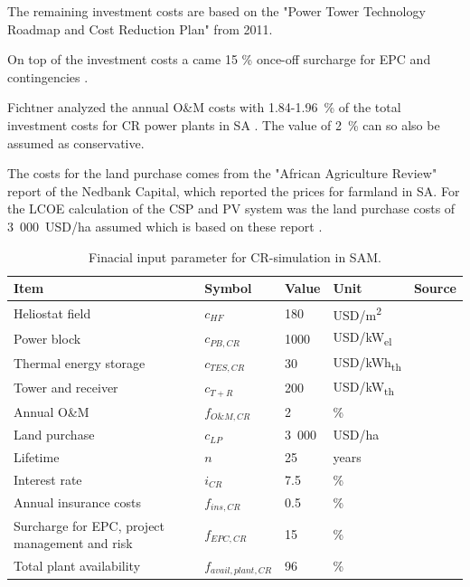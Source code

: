 The remaining investment costs are based on the "Power Tower Technology Roadmap and Cost Reduction Plan" \cite{Kolb2011} from 2011.

On top of the investment costs a came 15 \% once-off surcharge for EPC and contingencies \cite{Platzer2014}.

Fichtner analyzed the annual O\&M costs with 1.84-1.96~\% of the total investment costs for CR power plants in SA \cite{Fichtner2010}. The value of 2~\% can so also be assumed as conservative.

The costs for the land purchase comes from the "African Agriculture Review" report of the Nedbank Capital, which reported the prices for farmland in SA. For the LCOE calculation of the CSP and PV system was the land purchase costs of 3~000~USD/ha assumed which is based on these report \cite{Cassell2012}.

\begin{table}[!h]  
  \centering
	\begin{tabular}{  p{5.0cm} C{2.0cm} C{1.5cm}  C{1.5cm}  C{4.0cm} } 
	\hline	
\textbf{Item} & \textbf{Symbol}& \textbf{Value} & \textbf{Unit} & \textbf{Source}\\ \hline \hline
Heliostat field &$c_{HF}$ & 180 & USD/m\textsuperscript{2} & \cite{Blackmon2012}\\ 
Power block & $c_{PB,CR}$ & 1000 & USD/kW\textsubscript{el} & \cite{Kolb2011}\\ 
Thermal energy storage&$c_{TES,CR}$ & 30 & USD/kWh\textsubscript{th}  & \cite{Kolb2011}\\ 
Tower and receiver& $c_{T+R}$& 200 & USD/kW\textsubscript{th}  & \cite{Kolb2011}\\ 
Annual O\&M & $f_{O\&M,CR}$ & 2 & \% &\cite{Fichtner2010}\\
Land purchase&$c_{LP}$ & 3~000 & USD/ha & \cite{Cassell2012}\\ \hline
Lifetime &$n$ & 25 & years & \cite{FraunhoferISE2013} \\ 
Interest rate & $i_{CR}$ & 7.5 & \% & \cite{FraunhoferISE2013} \\ 
Annual insurance costs& $f_{ins,CR}$ & 0.5 & \% & \cite{IRENA2012}\\
Surcharge for EPC, project management and risk & $f_{EPC,CR}$& 15 & \% & \cite{Platzer2014} \\
Total plant availability & $f_{avail,plant,CR}$ & 96 & \% & \cite{Morin2012} \\ 
\hline
\end{tabular}
\caption[Finacial input parameter for CR-simulation in SAM.]{Finacial input parameter for CR-simulation in SAM.}\label{tbl: CRFinance}
\end{table}
